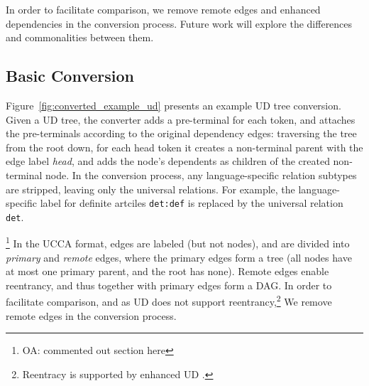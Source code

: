 \documentclass[11pt,a4paper]{article}
\newcommand{\oa}[1]{\footnote{\color{red}OA: #1}}
\begin{document}
In order to facilitate comparison,
we remove remote edges and enhanced dependencies in the conversion process.
Future work will explore the differences and commonalities between them.




\subsection{Basic Conversion}\label{sec:conversion}

Figure~\ref{fig:converted_example_ud} presents an example UD tree conversion.
Given a UD tree, the converter adds a pre-terminal for each token,
and attaches the pre-terminals according to the original dependency edges:
traversing the tree from the root down, for each head token it creates a non-terminal
parent with the edge label {\it head}, and adds the node's dependents as children of 
the created non-terminal node.
In the conversion process, any language-specific relation subtypes are stripped,
leaving only the universal relations.
For example, the language-specific label for definite artciles
\texttt{det:def} is replaced by the universal relation \texttt{det}.

\oa{commented out section here}
In the UCCA format, edges are labeled (but not nodes),
and are divided into \textit{primary} and \textit{remote} edges,
where the primary edges form a tree (all nodes have at most one primary parent,
and the root has none). Remote edges enable reentrancy, and thus together with primary edges
form a DAG. In order to facilitate comparison, and as UD does not support reentrancy,\footnote{Reentracy is supported by enhanced UD \cite{SCHUSTER16.779}.} We remove remote edges in the conversion process.



\end{document}
